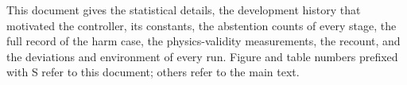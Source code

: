 This document gives the statistical details, the development history that motivated the controller, its constants, the abstention counts of every stage, the full record of the harm case, the physics-validity measurements, the recount, and the deviations and environment of every run. Figure and table numbers prefixed with S refer to this document; others refer to the main text.

